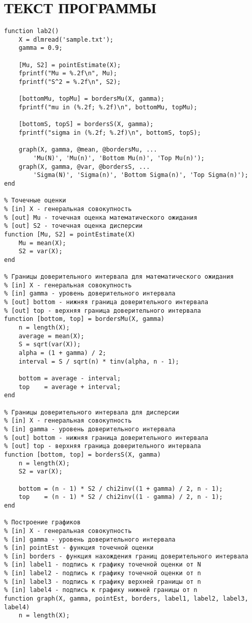 \section{ТЕКСТ ПРОГРАММЫ}

\begin{lstlisting}[caption=Текст программы]
function lab2()
    X = dlmread('sample.txt');
    gamma = 0.9;

    [Mu, S2] = pointEstimate(X);
    fprintf("Mu = %.2f\n", Mu);
    fprintf("S^2 = %.2f\n", S2);

    [bottomMu, topMu] = bordersMu(X, gamma);
    fprintf("mu in (%.2f; %.2f)\n", bottomMu, topMu);

    [bottomS, topS] = bordersS(X, gamma);
    fprintf("sigma in (%.2f; %.2f)\n", bottomS, topS);

    graph(X, gamma, @mean, @bordersMu, ...
        'Mu(N)', 'Mu(n)', 'Bottom Mu(n)', 'Top Mu(n)');
    graph(X, gamma, @var, @bordersS, ...
        'Sigma(N)', 'Sigma(n)', 'Bottom Sigma(n)', 'Top Sigma(n)');
end

% Точечные оценки
% [in] X - генеральная совокупность
% [out] Mu - точечная оценка математического ожидания
% [out] S2 - точечная оценка дисперсии
function [Mu, S2] = pointEstimate(X)
    Mu = mean(X);
    S2 = var(X);
end

% Границы доверительного интервала для математического ожидания
% [in] X - генеральная совокупность
% [in] gamma - уровень доверительного интервала
% [out] bottom - нижняя граница доверительного интервала
% [out] top - верхняя граница доверительного интервала
function [bottom, top] = bordersMu(X, gamma)
    n = length(X);
    average = mean(X);
    S = sqrt(var(X));
    alpha = (1 + gamma) / 2;
    interval = S / sqrt(n) * tinv(alpha, n - 1);

    bottom = average - interval;
    top    = average + interval;
end

% Границы доверительного интервала для дисперсии
% [in] X - генеральная совокупность
% [in] gamma - уровень доверительного интервала
% [out] bottom - нижняя граница доверительного интервала
% [out] top - верхняя граница доверительного интервала
function [bottom, top] = bordersS(X, gamma)
    n = length(X);
    S2 = var(X);

    bottom = (n - 1) * S2 / chi2inv((1 + gamma) / 2, n - 1);
    top    = (n - 1) * S2 / chi2inv((1 - gamma) / 2, n - 1);
end

% Построение графиков
% [in] X - генеральная совокупность
% [in] gamma - уровень доверительного интервала
% [in] pointEst - функция точечной оценки
% [in] borders - функция нахождения границ доверительного интервала
% [in] label1 - подпись к графику точечной оценки от N
% [in] label2 - подпись к графику точечной оценки от n
% [in] label3 - подпись к графику верхней границы от n
% [in] label4 - подпись к графику нижней границы от n
function graph(X, gamma, pointEst, borders, label1, label2, label3, label4)
    n = length(X);


\end{lstlisting}
